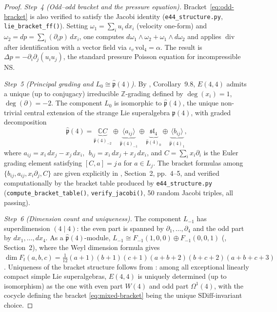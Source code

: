 \documentclass[reqno,10pt]{amsart}
\theoremstyle{definition}
\def\divX{{\operatorname{div}}}
\def\phat{\hat{\mathfrak{p}}}
\def\slN{{\mathfrak{sl}}_4}
\begin{document}
\begin{proof}
\smallskip
\noindent\textit{Step~4 (Odd--odd bracket and the pressure equation).}
Bracket~\eqref{eq:odd-bracket} is also verified to satisfy the Jacobi
identity (\texttt{e44\_structure.py}, \texttt{lie\_bracket\_ff()}).  Setting
$\omega_1 = \sum_i u_i\,dx_i$ (velocity one-form) and
$\omega_2 = dp = \sum_i(\partial_i p)\,dx_i$, one computes
$d\omega_1\wedge\omega_2 + \omega_1\wedge d\omega_2$ and applies
$\divX$ after identification with a vector field via
$\iota_v\,\mathrm{vol}_4 = \alpha$.  The result is
$\Delta p = -\partial_i\partial_j(u_i u_j)$, the standard pressure Poisson
equation for incompressible NS.

\smallskip
\noindent\textit{Step~5 (Principal grading and $L_0\cong\phat(4)$).}
By \cite{CCK2026}, Corollary~9.8, $E(4,4)$ admits a unique (up to conjugacy)
irreducible $\mathbb{Z}$-grading defined by $\deg(x_i) = 1$, $\deg(\partial) = -2$.
The component $L_0$ is isomorphic to $\phat(4)$, the unique non-trivial
central extension of the strange Lie superalgebra $\mathfrak{p}(4)$, with
graded decomposition
\[
  \phat(4)
  = \underbrace{\mathbb{C}C}_{\phat(4)_{-2}}
    \oplus\underbrace{\langle a_{ij}\rangle}_{\phat(4)_{-1}}
    \oplus\underbrace{\slN}_{\phat(4)_0}
    \oplus\underbrace{\langle b_{ij}\rangle}_{\phat(4)_1},
\]
where $a_{ij} = x_i\,dx_j - x_j\,dx_i$, $\;b_{ij} = x_i\,dx_j + x_j\,dx_i$,
and $C = \sum_i x_i\partial_i$ is the Euler grading element satisfying
$[C,a] = j\,a$ for $a\in L_j$.  The bracket formulas among
$\{b_{ij},a_{ij},x_i\partial_j,C\}$ are given explicitly in \cite{CCK2026},
Section~2, pp.~4--5, and verified computationally by the bracket table
produced by \texttt{e44\_structure.py} (\texttt{compute\_bracket\_table()},
\texttt{verify\_jacobi()}, 50 random Jacobi triples, all passing).

\smallskip
\noindent\textit{Step~6 (Dimension count and uniqueness).}
The component $L_{-1}$ has superdimension $(4\mid 4)$: the even part is
spanned by $\partial_1,\ldots,\partial_4$ and the odd part by
$dx_1,\ldots,dx_4$.  As a $\phat(4)$-module,
$L_{-1}\cong F_{-1}(1,0,0)\oplus F_{-1}(0,0,1)$
(\cite{CCK2026}, Section~2), where the Weyl dimension formula gives
$\dim F_t(a,b,c) = \tfrac{1}{12}(a{+}1)(b{+}1)(c{+}1)(a{+}b{+}2)(b{+}c{+}2)(a{+}b{+}c{+}3)$.
Uniqueness of the bracket structure follows from \cite{Kac1998}: among all
exceptional linearly compact simple Lie superalgebras, $E(4,4)$ is uniquely
determined (up to isomorphism) as the one with even part $W(4)$ and odd
part $\Omega^1(4)$, with the cocycle defining the bracket
\eqref{eq:mixed-bracket} being the unique $\mathrm{SDiff}$-invariant
choice.
\end{proof}
\end{document}
